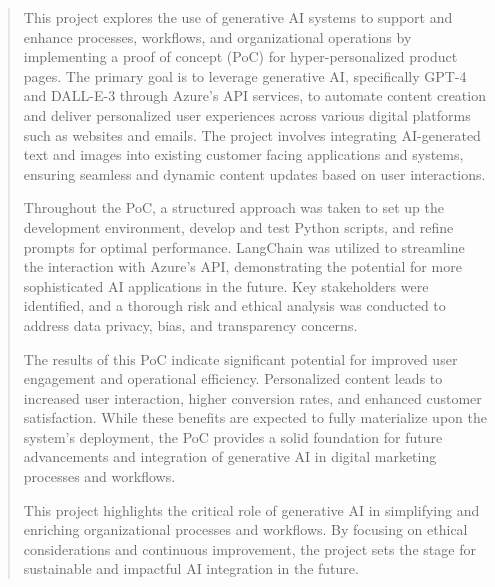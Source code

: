 \documentclass[%
pdftex,
oneside,			%
11pt,				%
parskip=half,		%
headheight = 12pt,	%
headsepline,		%
footsepline,		%
footheight = 16pt,	%
abstracton,		%
DIV=calc,		%
BCOR=8mm,		%
headinclude=false,	%
footinclude=false,	%
listof=totoc,		%
toc=bibliography,	%
]{scrreprt}	%
\begin{document}
\renewcommand{\abstractname}{Abstract}
\begin{abstract}








    This project explores the use of generative AI systems to support and enhance processes, workflows, and organizational operations by implementing a proof of concept (PoC) for hyper-personalized product pages. 
    The primary goal is to leverage generative AI, specifically GPT-4 and DALL-E-3 through Azure's API services, to automate content creation and deliver personalized user experiences across various digital platforms such as websites and emails. 
    The project involves integrating AI-generated text and images into existing customer facing applications and systems, ensuring seamless and dynamic content updates based on user interactions.

    Throughout the PoC, a structured approach was taken to set up the development environment, develop and test Python scripts, and refine prompts for optimal performance. 
    LangChain was utilized to streamline the interaction with Azure's API, demonstrating the potential for more sophisticated AI applications in the future. 
    Key stakeholders were identified, and a thorough risk and ethical analysis was conducted to address data privacy, bias, and transparency concerns.

    The results of this PoC indicate significant potential for improved user engagement and operational efficiency. 
    Personalized content leads to increased user interaction, higher conversion rates, and enhanced customer satisfaction. 
    While these benefits are expected to fully materialize upon the system's deployment, the PoC provides a solid foundation for future advancements and integration of generative AI in digital marketing processes and workflows.

    This project highlights the critical role of generative AI in simplifying and enriching organizational processes and workflows. 
    By focusing on ethical considerations and continuous improvement, the project sets the stage for sustainable and impactful AI integration in the future.



\end{abstract}
\end{document}
